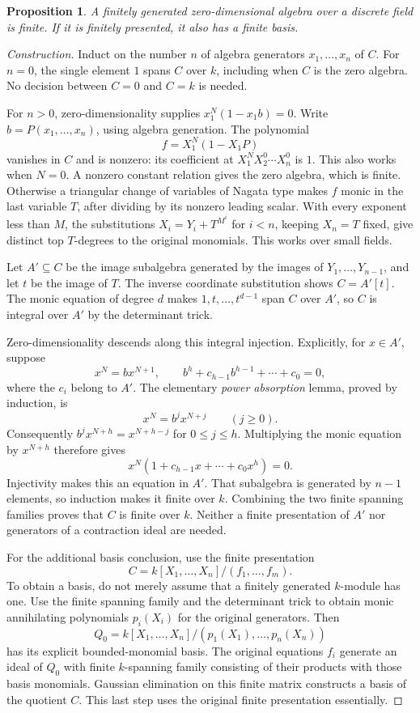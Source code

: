\documentclass[11pt]{article}
\newtheorem{proposition}{Proposition}
\begin{document}
\begin{proposition}\label{finite}
A finitely generated zero-dimensional algebra over a discrete field
is finite.  If it is finitely presented, it also has a finite basis.
\end{proposition}
\begin{proof}[Construction]
Induct on the number $n$ of algebra generators $x_1,\ldots,x_n$ of $C$.
For $n=0$, the single element $1$ spans $C$ over $k$, including when
$C$ is the zero algebra.  No decision between $C=0$ and $C=k$ is needed.

For $n>0$, zero-dimensionality supplies
$x_1^N(1-x_1b)=0$.  Write $b=P(x_1,\ldots,x_n)$, using algebra
generation.  The polynomial
\[
 f=X_1^N(1-X_1P)
\]
vanishes in $C$ and is nonzero: its coefficient at
$X_1^NX_2^0\cdots X_n^0$ is $1$.  This also works when $N=0$.
A nonzero constant relation gives the zero algebra, which is finite.
Otherwise a triangular change of variables of Nagata type makes $f$
monic in the last variable $T$, after dividing by its nonzero leading
scalar.  With every exponent less than $M$, the substitutions
$X_i=Y_i+T^{M^i}$ for $i<n$, keeping $X_n=T$ fixed, give distinct top
$T$-degrees to the original monomials.  This works over small fields.

Let $A'\subseteq C$ be the image subalgebra generated by the images of
$Y_1,\ldots,Y_{n-1}$, and let $t$ be the image of $T$.  The inverse
coordinate substitution shows $C=A'[t]$.  The monic equation of degree
$d$ makes $1,t,\ldots,t^{d-1}$ span $C$ over $A'$, so $C$ is integral
over $A'$ by the determinant trick.

Zero-dimensionality descends along this integral injection.  Explicitly,
for $x\in A'$, suppose
\[
 x^N=b x^{N+1},\qquad
 b^h+c_{h-1}b^{h-1}+\cdots+c_0=0,
\]
where the $c_i$ belong to $A'$.  The elementary \emph{power absorption}
lemma, proved by induction, is
\[
 x^N=b^j x^{N+j}\qquad(j\geq0).
\]
Consequently $b^j x^{N+h}=x^{N+h-j}$ for $0\leq j\leq h$.
Multiplying the monic equation by $x^{N+h}$ therefore gives
\[
 x^N(1+c_{h-1}x+\cdots+c_0x^h)=0.
\]
Injectivity makes this an equation in $A'$.  That subalgebra is generated
by $n-1$ elements, so induction makes it finite over $k$.  Combining
the two finite spanning families proves that $C$ is finite over $k$.
Neither a finite presentation of $A'$ nor generators of a contraction
ideal are needed.

For the additional basis conclusion, use the finite presentation
\[
 C=k[X_1,\ldots,X_n]/(f_1,\ldots,f_m).
\]
To obtain a basis, do not merely assume that a finitely generated
$k$-module has one.  Use the finite spanning family and the determinant
trick to obtain monic annihilating polynomials $p_i(X_i)$ for the
original generators.  Then
\[
 Q_0=k[X_1,\ldots,X_n]/(p_1(X_1),\ldots,p_n(X_n))
\]
has its explicit bounded-monomial basis.  The original equations
$f_i$ generate an ideal of $Q_0$ with finite $k$-spanning family
consisting of their products with those basis monomials.  Gaussian
elimination on this finite matrix constructs a basis of the quotient
$C$.  This last step uses the original finite presentation essentially.
\end{proof}
\end{document}
